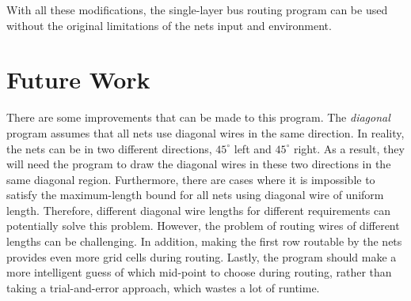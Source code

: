 With all these modifications, the single-layer bus routing program can be used without the original limitations of the nets input and environment.

\section{Future Work}\label{sec-fut}
There are some improvements that can be made to this program. The \textit{diagonal} program assumes that all nets use diagonal wires in the same direction. In reality, the nets can be in two different directions, $45^\circ$ left and $45^\circ$ right. As a result, they will need the program to draw the diagonal wires in these two directions in the same diagonal region. Furthermore, there are cases where it is impossible to satisfy the maximum-length bound for all nets using diagonal wire of uniform length.
Therefore, different diagonal wire lengths for different requirements can potentially solve this problem. However, the problem of routing wires of different lengths can be challenging. In addition, making the first row routable by the nets provides even more grid cells during routing. Lastly, the program should make a more intelligent guess of which mid-point to choose during routing, rather than taking a trial-and-error approach, which wastes a lot of runtime.
